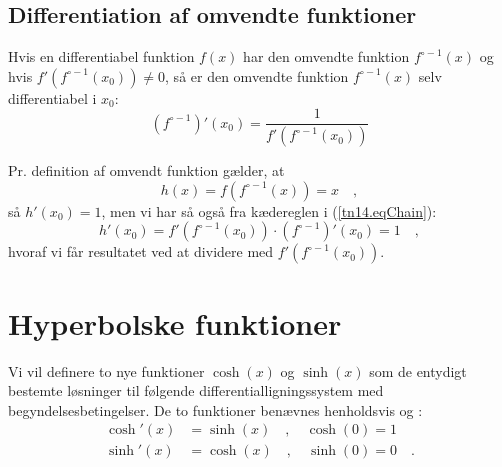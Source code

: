 
\subsection{Differentiation af omvendte funktioner}

\begin{theorem}
Hvis en differentiabel funktion $f(x)$ har den omvendte funktion $f^{\circ-1}(x)$ og hvis $f'(f^{\circ-1}(x_{0})) \neq 0$, så er den omvendte funktion $f^{\circ-1}(x)$ selv differentiabel i $x_{0}$:
\begin{equation}
(f^{\circ-1})'(x_{0}) = \frac{1}{f'(f^{\circ-1}(x_{0}))}
\end{equation}
\end{theorem}
\begin{bevis}
Pr. definition af omvendt funktion gælder, at
\begin{equation}
h(x) = f(f^{\circ-1}(x)) = x \quad,
\end{equation}
så $h'(x_{0}) = 1$, men vi har så også fra kædereglen i (\ref{tn14.eqChain}):
\begin{equation}
h'(x_{0}) = f'(f^{\circ-1}(x_{0}))\cdot (f^{\circ-1})'(x_{0}) = 1 \quad ,
\end{equation}
hvoraf vi får resultatet ved at dividere med $f'(f^{\circ-1}(x_{0}))$.
\end{bevis}





\section{Hyperbolske funktioner}

\begin{definition} \label{tn14.defCoshSinh}
Vi vil definere to nye funktioner $\cosh(x)$ og $\sinh(x)$ som de entydigt bestemte løsninger til følgende
differentialligningssystem med begyndelsesbetingelser. De to funktioner benævnes henholdsvis  og :
\begin{equation} \label{tn14.eqCoshSinhDES}
\begin{aligned}
\cosh'(x) &= \sinh(x) \quad , \quad \cosh(0) = 1 \\
\sinh'(x) &= \cosh(x) \quad , \quad \sinh(0) = 0 \quad .
\end{aligned}
\end{equation}
\end{definition}

